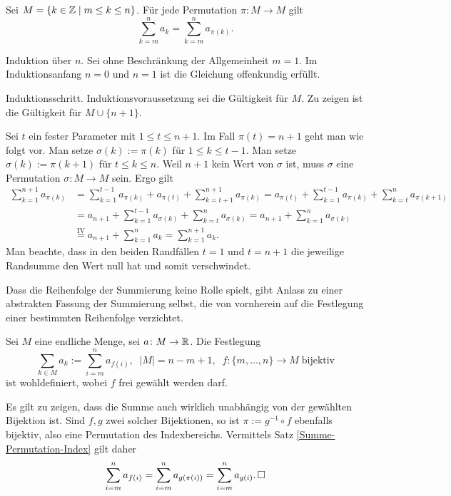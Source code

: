 \begin{Satz}%
\label{Summe-Permutation-Index}\newlinefirst
Sei $M=\{k\in\mathbb Z\mid m\le k\le n\}$. Für jede Permutation
$\pi\colon M\to M$ gilt
\[\sum_{k=m}^n a_k = \sum_{k=m}^n a_{\pi(k)}.\]
\end{Satz}
\begin{Beweis} Induktion über $n$. Sei ohne Beschränkung der Allgemeinheit $m=1$.
Im Induktionsanfang $n=0$ und $n=1$ ist die Gleichung offenkundig erfüllt.

Induktionsschritt. Induktionsvoraussetzung sei die Gültigkeit für $M$.
Zu zeigen ist die Gültigkeit für $M\cup\{n+1\}$.

Sei $t$ ein fester Parameter mit $1\le t\le n+1$.
Im Fall $\pi(t) = n+1$ geht man wie folgt vor.
Man setze $\sigma(k):=\pi(k)$ für $1\le k\le t-1$. Man setze
$\sigma(k):=\pi(k+1)$ für $t\le k\le n$. Weil $n+1$ kein Wert von
$\sigma$ ist, muss $\sigma$ eine Permutation $\sigma\colon M\to M$ sein.
Ergo gilt
\begin{align*}
\sum_{k=1}^{n+1} a_{\pi(k)} &= \sum_{k=1}^{t-1} a_{\pi(k)}
+ a_{\pi(t)} + \sum_{k=t+1}^{n+1} a_{\pi(k)}
= a_{\pi(t)} + \sum_{k=1}^{t-1} a_{\pi(k)}
+ \sum_{k=t}^n a_{\pi(k+1)}\\
&= a_{n+1} + \sum_{k=1}^{t-1} a_{\sigma(k)}
+ \sum_{k=t}^n a_{\sigma(k)}
= a_{n+1} + \sum_{k=1}^n a_{\sigma(k)}\\
&\stackrel{\mathrm{IV}}= a_{n+1} + \sum_{k=1}^n a_k
= \sum_{k=1}^{n+1} a_k.
\end{align*}
Man beachte, dass in den beiden Randfällen $t=1$ und $t=n+1$ die
jeweilige Randsumme den Wert null hat und somit verschwindet.\,\qedsymbol
\end{Beweis}

\noindent
Dass die Reihenfolge der Summierung keine Rolle spielt, gibt Anlass
zu einer abstrakten Fassung der Summierung selbst, die von vornherein
auf die Festlegung einer bestimmten Reihenfolge verzichtet.

\begin{Satz}
Sei $M$ eine endliche Menge, sei $a\colon M\to\mathbb R$. Die Festlegung
\[\sum_{k\in M} a_k := \sum_{i=m}^n a_{f(i)},\;\; |M| = n-m+1,\;\;
f\colon\{m,\ldots,n\}\to M\;\text{bijektiv}\]
ist wohldefiniert, wobei $f$ frei gewählt werden darf.
\end{Satz}
\begin{Beweis}
Es gilt zu zeigen, dass die Summe auch wirklich unabhängig von der
gewählten Bijektion ist. Sind $f,g$ zwei solcher Bijektionen, so ist
$\pi := g^{-1}\circ f$ ebenfalls bijektiv, also eine Permutation des
Indexbereichs. Vermittels Satz \ref{Summe-Permutation-Index} gilt daher
\[\sum_{i=m}^n a_{f(i)} = \sum_{i=m}^n a_{g(\pi(i))}
= \sum_{i=m}^n a_{g(i)}.\,\Box\]
\end{Beweis}

